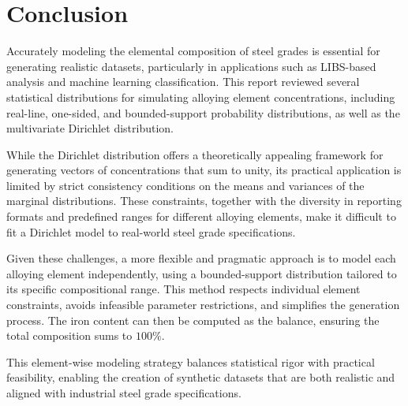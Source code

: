 \documentclass[12pt,a4paper]{article}
\begin{document}
	
\section{Conclusion} \label{h:Conclusion}
Accurately modeling the elemental composition of steel grades is essential for generating realistic datasets, particularly in applications such as LIBS-based analysis and machine learning classification. This report reviewed several statistical distributions for simulating alloying element concentrations, including real-line, one-sided, and bounded-support probability distributions, as well as the multivariate Dirichlet distribution. 

While the Dirichlet distribution offers a theoretically appealing framework for generating vectors of concentrations that sum to unity, its practical application is limited by strict consistency conditions on the means and variances of the marginal distributions. These constraints, together with the diversity in reporting formats and predefined ranges for different alloying elements, make it difficult to fit a  Dirichlet model to real-world steel grade specifications.

Given these challenges, a more flexible and pragmatic approach is to model each alloying element independently, using a bounded-support distribution tailored to its specific compositional range. This method respects individual element constraints, avoids infeasible parameter restrictions, and simplifies the generation process. The iron content can then be computed as the balance, ensuring the total composition sums to \(100\%\). 

This element-wise modeling strategy balances statistical rigor with practical feasibility, enabling the creation of synthetic datasets that are both realistic and aligned with industrial steel grade specifications.

	
	\newpage
%	
	
%	
%	
	
\end{document}
